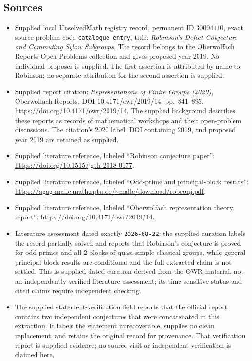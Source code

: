 \documentclass[11pt]{article}
\begin{document}
\subsection{Sources}
\begin{itemize}
\item Supplied local UnsolvedMath registry record, permanent ID \(30004110\), exact source problem code \texttt{catalogue entry}, title: \emph{Robinson's Defect Conjecture and Commuting Sylow Subgroups}. The record belongs to the Oberwolfach Reports Open Problems collection and gives proposed year 2019. No individual proposer is supplied. The first assertion is attributed by name to Robinson; no separate attribution for the second assertion is supplied.
\item Supplied report citation: \emph{Representations of Finite Groups (2020)}, Oberwolfach Reports, DOI 10.4171/owr/2019/14, pp.\ 841--895. \url{https://doi.org/10.4171/owr/2019/14}. The supplied background describes these reports as records of mathematical workshops and their open-problem discussions. The citation's 2020 label, DOI containing 2019, and proposed year 2019 are retained as supplied.
\item Supplied literature reference, labeled ``Robinson conjecture paper'': \url{https://doi.org/10.1515/jgth-2018-0177}.
\item Supplied literature reference, labeled ``Odd-prime and principal-block results'': \url{https://agag-malle.math.rptu.de/~malle/download/robconj.pdf}.
\item Supplied literature reference, labeled ``Oberwolfach representation theory report'': \url{https://doi.org/10.4171/owr/2019/14}.
\item Literature assessment dated exactly \texttt{2026-08-22}: the supplied curation labels the record partially solved and reports that Robinson's conjecture is proved for odd primes and all \(2\)-blocks of quasi-simple classical groups, while general principal-block results are conditional and the full extracted claim is not settled. This is supplied dated curation derived from the OWR material, not an independently verified literature assessment; its time-sensitive status and cited claims require independent checking.
\item The supplied statement-verification field reports that the official report contains two independent conjectures that were concatenated in this extraction. It labels the statement unrecoverable, supplies no clean replacement, and retains the original record for provenance. That verification report is supplied evidence; no source visit or independent verification is claimed here.
\end{itemize}
\end{document}
